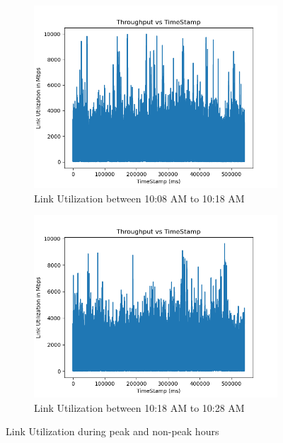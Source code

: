 \begin{figure}[t]
\begin{subfigure}[h]{0.49\textwidth}
         \label{fig:linkutil2}
     \end{subfigure}
     \begin{subfigure}[h]{0.49\textwidth}
         \centering
         \includegraphics[width=\textwidth]{Figures/saturation_link_3.png}
         \caption[Link Utilization between 10:08 AM to 10:18 AM ]{Link Utilization between 10:08 AM to 10:18 AM }
         \label{fig:linkutil3}
     \end{subfigure}
     \begin{subfigure}[h]{0.49\textwidth}
         \centering
         \includegraphics[width=\textwidth]{Figures/saturation_link_4.png}
         \caption[Link Utilization between 10:18 AM to 10:28 AM ]{Link Utilization between 10:18 AM to 10:28 AM }
         \label{fig:linkutil4}
     \end{subfigure}
     \bigskip
     \caption[Link Utilization during peak and non-peak hours]{Link Utilization during peak and non-peak hours}
     \label{fig:linkutilization}
     \bigskip
\end{figure}


